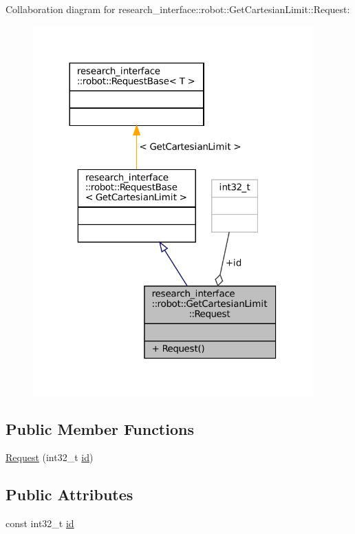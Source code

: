 Collaboration diagram for research\+\_\+interface\+:\+:robot\+:\+:Get\+Cartesian\+Limit\+:\+:Request\+:
\nopagebreak
\begin{figure}[H]
\begin{center}
\leavevmode
\includegraphics[width=305pt]{structresearch__interface_1_1robot_1_1GetCartesianLimit_1_1Request__coll__graph}
\end{center}
\end{figure}
\subsection*{Public Member Functions}
\begin{DoxyCompactItemize}
\item 
\hyperlink{structresearch__interface_1_1robot_1_1GetCartesianLimit_1_1Request_af67a8f29ce79cd50457c6acf910ea529}{Request} (int32\+\_\+t \hyperlink{structresearch__interface_1_1robot_1_1GetCartesianLimit_1_1Request_a5a735fb6ebe458cd048ef29df7394728}{id})
\end{DoxyCompactItemize}
\subsection*{Public Attributes}
\begin{DoxyCompactItemize}
\item 
const int32\+\_\+t \hyperlink{structresearch__interface_1_1robot_1_1GetCartesianLimit_1_1Request_a5a735fb6ebe458cd048ef29df7394728}{id}
\end{DoxyCompactItemize}


